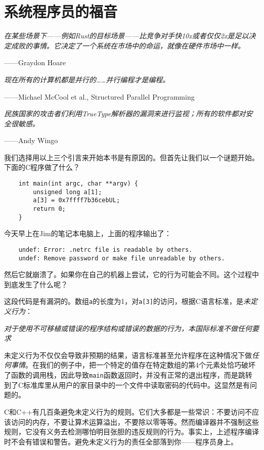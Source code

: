 \chapter{系统程序员的福音}\label{ch01}
\emph{在某些场景下——例如Rust的目标场景——比竞争对手快10x或者仅仅2x是足以决定成败的事情。它决定了一个系统在市场中的命运，就像在硬件市场中一样。}
\begin{flushright}
    ——Graydon Hoare
\end{flushright}

\emph{现在所有的计算机都是并行的……并行编程才是编程。}
\begin{flushright}
    ——Michael McCool et al., Structured Parallel Programming    
\end{flushright}

\emph{民族国家的攻击者们利用TrueType解析器的漏洞来进行监视；所有的软件都对安全很敏感。}
\begin{flushright}
    ——Andy Wingo
\end{flushright}

我们选择用以上三个引言来开始本书是有原因的。但首先让我们以一个谜题开始。下面的C程序做了什么？
\begin{verbatim}
    int main(int argc, char **argv) {
        unsigned long a[1];
        a[3] = 0x7ffff7b36cebUL;
        return 0;
    }
\end{verbatim}

今天早上在Jim的笔记本电脑上，上面的程序输出了：
\begin{verbatim}
    undef: Error: .netrc file is readable by others.
    undef: Remove password or make file unreadable by others.
\end{verbatim}
然后它就崩溃了。如果你在自己的机器上尝试，它的行为可能会不同。这个过程中到底发生了什么呢？

这段代码是有漏洞的。数组\texttt{a}的长度为1，对\texttt{a[3]}的访问，根据C语言标准，是\emph{未定义行为}：

\emph{对于使用不可移植或错误的程序结构或错误的数据的行为，本国际标准不做任何要求}

未定义行为不仅仅会导致非预期的结果，语言标准甚至允许程序在这种情况下做\emph{任何事情}。在我们的例子中，把一个特定的值存在特定数组的第4个元素处恰巧破坏了函数的调用栈，因此导致\texttt{main}函数返回时，并没有正常的退出程序，而是跳转到了C标准库里从用户的家目录中的一个文件中读取密码的代码中。这显然是有问题的。

C和C++有几百条避免未定义行为的规则。它们大多都是一些常识：不要访问不应该访问的内存，不要让算术运算溢出，不要除以零等等。然而编译器并不强制这些规则，它没有义务去检测哪怕明目张胆的违反规则的行为。事实上，上述程序编译时不会有错误和警告。避免未定义行为的责任全部落到你——程序员身上。

